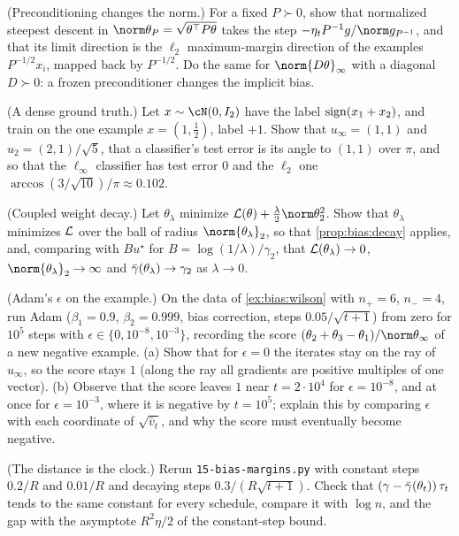 \begin{refsection}
\begin{exercises}
\item \variation (Preconditioning changes the norm.) For a fixed $P\succ0$, show that normalized steepest descent in $\norm\theta_P=\sqrt{\theta^\top P\theta}$ takes the step $-\eta_tP^{-1}g/\norm g_{P^{-1}}$, and that its limit direction is the $\ell_2$ maximum-margin direction of the examples $P^{-1/2}x_i$, mapped back by $P^{-1/2}$. Do the same for $\norm{D\theta}_\infty$ with a diagonal $D\succ0$: a frozen preconditioner changes the implicit bias.\label{ex:bias:precond}

\item \variation (A dense ground truth.) Let $x\sim\cN(0,I_2)$ have the label $\operatorname{sign}(x_1+x_2)$, and train on the one example $x=(1,\frac12)$, label $+1$. Show that $u_\infty=(1,1)$ and $u_2=(2,1)/\sqrt5$, that a classifier's test error is its angle to $(1,1)$ over $\pi$, and so that the $\ell_\infty$ classifier has test error $0$ and the $\ell_2$ one $\arccos(3/\sqrt{10})/\pi\approx0.102$.\label{ex:bias:dense}

\item \variation (Coupled weight decay.) Let $\theta_\lambda$ minimize $\Loss(\theta)+\frac\lambda2\norm\theta_2^2$. Show that $\theta_\lambda$ minimizes $\mathcal{L}$ over the ball of radius $\norm{\theta_\lambda}_2$, so that \cref{prop:bias:decay} applies, and, comparing with $Bu^\star$ for $B=\log(1/\lambda)/\gamma_2$, that $\mathcal{L}(\theta_\lambda)\to0$, $\norm{\theta_\lambda}_2\to\infty$ and $\bar\gamma(\theta_\lambda)\to\gamma_2$ as $\lambda\to0$.\label{ex:bias:penalty}

\item \simulation (Adam's $\epsilon$ on the example.) On the data of \cref{ex:bias:wilson} with $n_+=6$, $n_-=4$, run Adam ($\beta_1=0.9$, $\beta_2=0.999$, bias correction, steps $0.05/\sqrt{t+1}$) from zero for $10^5$ steps with $\epsilon\in\{0,10^{-8},10^{-3}\}$, recording the score $(\theta_2+\theta_3-\theta_1)/\norm\theta_\infty$ of a new negative example. (a) Show that for $\epsilon=0$ the iterates stay on the ray of $u_\infty$, so the score stays $1$ (along the ray all gradients are positive multiples of one vector). (b) Observe that the score leaves $1$ near $t=2\cdot10^4$ for $\epsilon=10^{-8}$, and at once for $\epsilon=10^{-3}$, where it is negative by $t=10^5$; explain this by comparing $\epsilon$ with each coordinate of $\sqrt{\hat v_t}$, and why the score must eventually become negative.\label{ex:bias:eps}

\item \simulation (The distance is the clock.) Rerun \texttt{15-bias-margins.py} with constant steps $0.2/R$ and $0.01/R$ and decaying steps $0.3/(R\sqrt{t+1})$. Check that $(\gamma-\bar\gamma(\theta_t))\,\tau_t$ tends to the same constant for every schedule, compare it with $\log n$, and the gap with the asymptote $R^2\eta/2$ of the constant-step bound.\label{ex:bias:clock}


\end{exercises}
\end{refsection}
